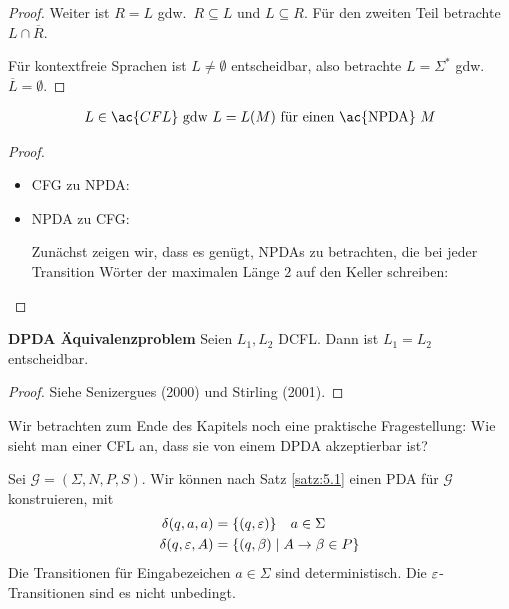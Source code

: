 {{\begin{proof}
    Weiter ist $R = L$ gdw.\ $R\subseteq L$ und $L \subseteq R$. Für den zweiten Teil betrachte $L\cap \overline{R}$.
    
    Für kontextfreie Sprachen ist $L\ne \emptyset$ entscheidbar, also betrachte $L=\Sigma^*$ gdw.\ $\overline{L}=\emptyset$.
\end{proof}















\begin{Satz}\label{satz:5.1}
  \begin{align*}
                L \in \ac{CFL}  \text{ gdw } L =L(M) \text{ für einen \ac{NPDA} $M$}
  \end{align*}
\end{Satz}
\begin{proof}\hfill
        \begin{itemize}
        \item \ac{CFG} zu \ac{NPDA}:


  \item \ac{NPDA} zu \ac{CFG}:

    Zunächst zeigen wir, dass es genügt, \ac{NPDA}s zu betrachten, die bei jeder Transition Wörter der maximalen Länge $2$ auf den Keller schreiben:



\end{itemize}
  
\end{proof}



\begin{Satz} \textbf{DPDA Äquivalenzproblem}
    Seien $L_1, L_2$ DCFL. Dann ist $L_1 = L_2$ entscheidbar.
\end{Satz}

\begin{proof}
    Siehe Senizergues (2000) und Stirling (2001).
\end{proof}

Wir betrachten zum Ende des Kapitels noch eine praktische Fragestellung: Wie sieht man einer CFL an, dass sie von einem DPDA akzeptierbar ist?

Sei $\mathcal{G} = (\Sigma, N, P, S)$.
Wir können nach Satz \ref{satz:5.1} einen \ac{PDA} für $\mathcal{G}$ konstruieren, mit
\begin{align*}
  \delta(q, a, a) &= \{(q, \varepsilon)\} \quad a \in \Sigma \\
  \delta(q, \varepsilon, A) &= \{(q, \beta)  \mid A \to \beta \in P\}
\end{align*}
Die Transitionen für Eingabezeichen $a \in \Sigma$ sind deterministisch.
Die $\varepsilon$-Transitionen sind es nicht unbedingt.

}}
